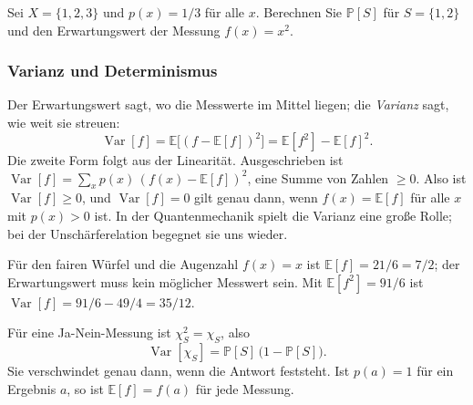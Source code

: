 
\begin{übung}
	Sei $X = \{1, 2, 3\}$ und $p(x) = 1/3$ für alle $x$. Berechnen Sie $\mathbb{P}[S]$ für $S = \{1, 2\}$ und den Erwartungswert der Messung $f(x) = x^2$.
\end{übung}

\subsubsection{Varianz und Determinismus}
Der Erwartungswert sagt, wo die Messwerte im Mittel liegen; die \emph{Varianz} sagt, wie weit sie streuen:
\begin{equation}
	\operatorname{Var}[f] = \mathbb{E}\bigl[(f - \mathbb{E}[f])^2\bigr] = \mathbb{E}[f^2] - \mathbb{E}[f]^2 .
\end{equation}
Die zweite Form folgt aus der Linearität. Ausgeschrieben ist $\operatorname{Var}[f] = \sum_x p(x)\,(f(x) - \mathbb{E}[f])^2$, eine Summe von Zahlen $\geq 0$. Also ist $\operatorname{Var}[f] \geq 0$, und $\operatorname{Var}[f] = 0$ gilt genau dann, wenn $f(x) = \mathbb{E}[f]$ für alle $x$ mit $p(x) > 0$ ist. In der Quantenmechanik spielt die Varianz eine große Rolle; bei der Unschärferelation begegnet sie uns wieder.

\begin{beispiel}
	Für den fairen Würfel und die Augenzahl $f(x) = x$ ist $\mathbb{E}[f] = 21/6 = 7/2$; der Erwartungswert muss kein möglicher Messwert sein. Mit $\mathbb{E}[f^2] = 91/6$ ist $\operatorname{Var}[f] = 91/6 - 49/4 = 35/12$.
\end{beispiel}

Für eine Ja-Nein-Messung ist $\chi_S^2 = \chi_S$, also
\begin{equation}
	\operatorname{Var}[\chi_S] = \mathbb{P}[S]\,\bigl(1 - \mathbb{P}[S]\bigr).
\end{equation}
Sie verschwindet genau dann, wenn die Antwort feststeht. Ist $p(a) = 1$ für ein Ergebnis $a$, so ist $\mathbb{E}[f] = f(a)$ für jede Messung.


